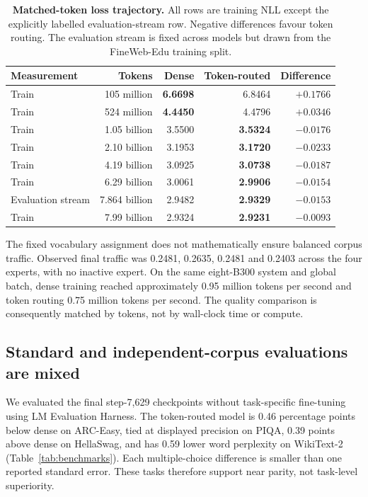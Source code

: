 \documentclass[11pt]{article}
\begin{document}
\begin{table}[t]
\centering
\small
\caption{\textbf{Matched-token loss trajectory.} All rows are training NLL except the explicitly labelled evaluation-stream row. Negative differences favour token routing. The evaluation stream is fixed across models but drawn from the FineWeb-Edu training split.}
\label{tab:trajectory}
\begin{tabular}{lrrrr}
\toprule
Measurement & Tokens & Dense & Token-routed & Difference \\
\midrule
Train & 105 million & \textbf{6.6698} & 6.8464 & $+0.1766$ \\
Train & 524 million & \textbf{4.4450} & 4.4796 & $+0.0346$ \\
Train & 1.05 billion & 3.5500 & \textbf{3.5324} & $-0.0176$ \\
Train & 2.10 billion & 3.1953 & \textbf{3.1720} & $-0.0233$ \\
Train & 4.19 billion & 3.0925 & \textbf{3.0738} & $-0.0187$ \\
Train & 6.29 billion & 3.0061 & \textbf{2.9906} & $-0.0154$ \\
Evaluation stream & 7.864 billion & 2.9482 & \textbf{2.9329} & $-0.0153$ \\
Train & 7.99 billion & 2.9324 & \textbf{2.9231} & $-0.0093$ \\
\bottomrule
\end{tabular}
\end{table}

The fixed vocabulary assignment does not mathematically ensure balanced corpus traffic. Observed final traffic was 0.2481, 0.2635, 0.2481 and 0.2403 across the four experts, with no inactive expert. On the same eight-B300 system and global batch, dense training reached approximately 0.95 million tokens per second and token routing 0.75 million tokens per second. The quality comparison is consequently matched by tokens, not by wall-clock time or compute.

\subsection*{Standard and independent-corpus evaluations are mixed}

We evaluated the final step-7,629 checkpoints without task-specific fine-tuning using LM Evaluation Harness\cite{biderman2024reproducible}. The token-routed model is 0.46 percentage points below dense on ARC-Easy\cite{clark2018arc}, tied at displayed precision on PIQA\cite{bisk2020piqa}, 0.39 points above dense on HellaSwag\cite{zellers2019hellaswag}, and has 0.59 lower word perplexity on WikiText-2\cite{merity2017pointer} (Table~\ref{tab:benchmarks}). Each multiple-choice difference is smaller than one reported standard error. These tasks therefore support near parity, not task-level superiority.
\end{document}
